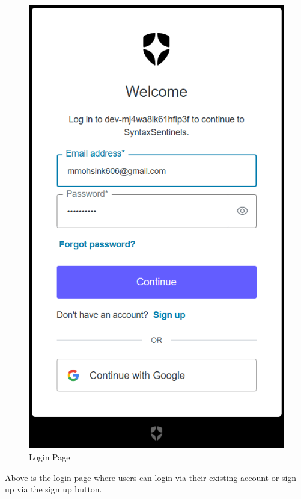 \documentclass{article}
\begin{document}
\begin{figure}[H]
    \centering
    \includegraphics[height=\dimexpr\textheight-5cm\relax]{Login.png}
    \caption{Login Page}
    \label{fig:Login}
  \end{figure}

Above is the login page where users can login via their existing account or sign up via the sign up button.
\end{document}
